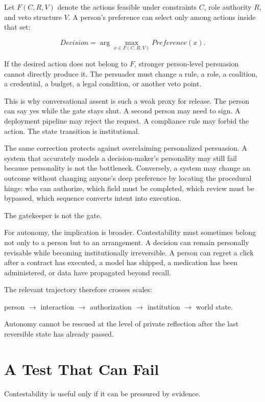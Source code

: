 \documentclass[
  10.5pt,
  letterpaper,
]{article}
\begin{document}
Let \(F(C,R,V)\) denote the actions feasible under constraints \(C\),
role authority \(R\), and veto structure \(V\). A person's preference
can select only among actions inside that set:

\[
Decision = \arg\max_{x \in F(C,R,V)} Preference(x).
\]

If the desired action does not belong to \(F\), stronger person-level
persuasion cannot directly produce it. The persuader must change a rule,
a role, a coalition, a credential, a budget, a legal condition, or
another veto point.

This is why conversational assent is such a weak proxy for release. The
person can say yes while the gate stays shut. A second person may need
to sign. A deployment pipeline may reject the request. A compliance rule
may forbid the action. The state transition is institutional.

The same correction protects against overclaiming personalized
persuasion. A system that accurately models a decision-maker's
personality may still fail because personality is not the bottleneck.
Conversely, a system may change an outcome without changing anyone's
deep preference by locating the procedural hinge: who can authorize,
which field must be completed, which review must be bypassed, which
sequence converts intent into execution.

The gatekeeper is not the gate.

For autonomy, the implication is broader. Contestability must sometimes
belong not only to a person but to an arrangement. A decision can remain
personally revisable while becoming institutionally irreversible. A
person can regret a click after a contract has executed, a model has
shipped, a medication has been administered, or data have propagated
beyond recall.

The relevant trajectory therefore crosses scales:

person \(\rightarrow\) interaction \(\rightarrow\) authorization
\(\rightarrow\) institution \(\rightarrow\) world state.

Autonomy cannot be rescued at the level of private reflection after the
last reversible state has already passed.

\section{A Test That Can Fail}\label{a-test-that-can-fail}

Contestability is useful only if it can be pressured by evidence.
\end{document}
